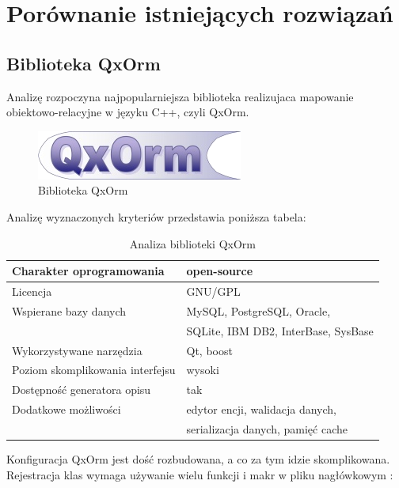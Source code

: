 \documentclass[12pt]{report}
\begin{document}
\section{Porównanie istniejących rozwiązań}

\subsection{Biblioteka QxOrm}

Analizę rozpoczyna najpopularniejsza biblioteka realizujaca mapowanie obiektowo-relacyjne w języku C++, czyli QxOrm.

\begin{figure}[h]
\centering
\includegraphics[width=.5\textwidth]{resources/qxorm.png}
\caption[Biblioteka QxOrm]{Biblioteka QxOrm \cite{qxorm}}
\end{figure}

\newpage

Analizę wyznaczonych kryteriów przedstawia poniższa tabela:

\begin{table}[h]
\centering
\begin{tabular}{| l | l |} 
\hline 
Charakter oprogramowania & open-source \\ \hline
Licencja & GNU/GPL  \\ \hline
Wspierane bazy danych & MySQL, PostgreSQL, Oracle, \\ \hline
& SQLite, IBM DB2, InterBase, SysBase \\ \hline
Wykorzystywane narzędzia & Qt, boost  \\ \hline
Poziom skomplikowania interfejsu & wysoki  \\ \hline
Dostępność generatora opisu & tak  \\ \hline
Dodatkowe możliwości &  edytor encji, walidacja danych,   \\ \hline
& serializacja danych, pamięć cache  \\ \hline
\end{tabular} 
\caption{Analiza biblioteki QxOrm}
\end{table}

Konfiguracja QxOrm jest dość rozbudowana, a co za tym idzie skomplikowana. Rejestracja klas wymaga używanie wielu funkcji i makr w pliku nagłówkowym \cite{qxorm}:
\end{document}
